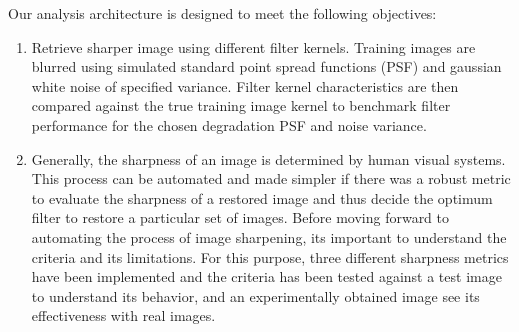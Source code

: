 \noindent Our analysis architecture is designed to meet the following objectives:
\begin{enumerate}
\item  Retrieve sharper image using different filter kernels. Training images are blurred using simulated standard point spread functions (PSF) and gaussian white noise of specified variance. Filter kernel characteristics are then compared against the true training image kernel to benchmark filter performance for the chosen degradation PSF and noise variance. 
\item Generally, the sharpness of an image is determined by human visual systems. This process can be automated and made simpler if there was a robust metric to evaluate the sharpness of a restored image and thus decide the optimum filter to restore a particular set of images. Before moving forward to automating the process of image sharpening, its important to understand the criteria and its limitations. For this purpose, three different sharpness metrics have been implemented and the criteria has been tested against a test image to understand its behavior, and an experimentally obtained image see its effectiveness with real images.

\end{enumerate}
\newpage